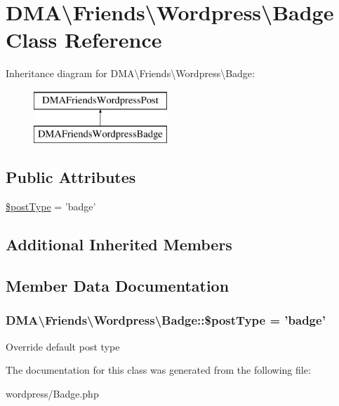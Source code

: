 \hypertarget{classDMA_1_1Friends_1_1Wordpress_1_1Badge}{\section{D\+M\+A\textbackslash{}Friends\textbackslash{}Wordpress\textbackslash{}Badge Class Reference}
\label{classDMA_1_1Friends_1_1Wordpress_1_1Badge}
}
Inheritance diagram for D\+M\+A\textbackslash{}Friends\textbackslash{}Wordpress\textbackslash{}Badge\+:\begin{figure}[H]
\begin{center}
\leavevmode
\includegraphics[height=2.000000cm]{d8/d3a/classDMA_1_1Friends_1_1Wordpress_1_1Badge}
\end{center}
\end{figure}
\subsection*{Public Attributes}
\begin{DoxyCompactItemize}
\item 
\hyperlink{classDMA_1_1Friends_1_1Wordpress_1_1Badge_a3044aa841b86f76868023889de4ca114}{\$post\+Type} = 'badge'
\end{DoxyCompactItemize}
\subsection*{Additional Inherited Members}


\subsection{Member Data Documentation}
\hypertarget{classDMA_1_1Friends_1_1Wordpress_1_1Badge_a3044aa841b86f76868023889de4ca114}{
\subsubsection[{\$post\+Type}]{\setlength{\rightskip}{0pt plus 5cm}D\+M\+A\textbackslash{}\+Friends\textbackslash{}\+Wordpress\textbackslash{}\+Badge\+::\$post\+Type = 'badge'}}\label{classDMA_1_1Friends_1_1Wordpress_1_1Badge_a3044aa841b86f76868023889de4ca114}
Override default post type 

The documentation for this class was generated from the following file\+:\begin{DoxyCompactItemize}
\item 
wordpress/Badge.\+php\end{DoxyCompactItemize}
